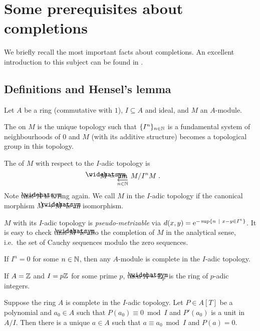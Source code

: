 \documentclass[a4paper,parskip=half,numbers=enddot, DIV=12]{scrreprt}
\begin{document}
\section{Some prerequisites about completions}
We briefly recall the most important facts about completions. An excellent introduction to this subject can be found in \cite[Section~10]{atiyahMacdonald}.
\subsection{Definitions and Hensel's lemma}
\begin{defi}
	Let $A$ be a ring (commutative with $1$), $I\subseteq A$ and ideal, and $M$ an $A$-module.
	\begin{alphanumerate}
		\item The  on $M$ is the unique topology such that $\{I^n\}_{n\in \mathbb{N}}$ is a fundamental system of neighbourhoods of $0$ and $M$ (with its additive structure) becomes a topological group in this topology.
		\item The  of $M$ with respect to the $I$-adic topology is
		\begin{align*}
			\roof{M}=\limit[n\in \IN]M/I^nM\;.
		\end{align*}
		Note that $\roof{A}$ is a ring again. We call $M$  in the $I$-adic topology if the canonical morphism $M\morphism\roof{M}$ is an isomorphism.
	\end{alphanumerate}
\end{defi}
\begin{rem}
	$M$ with its $I$-adic topology is \emph{pseudo-metrizable} via $d(x,y)=\mathrm{e}^{-\sup\left\{n\ \middle|\  x-y\in I^n\right\}}$. It is easy to check that $\roof{M}$ is also the completion of $M$ in the analytical sense, i.e.\ the set of Cauchy sequences modulo the zero sequences.
\end{rem}
\begin{example}
	If $I^n=0$ for some $n\in \mathbb{N}$, then any $A$-module is complete in the $I$-adic topology.
\end{example}
\begin{example}
	If $A=\mathbb{Z}$ and $I=p\mathbb{Z}$ for some prime $p$, then $\roof{A}=\IZ_p$ is the ring of $p$-adic integers.
\end{example}
\begin{prop}
	Suppose the ring $A$ is complete in the $I$-adic topology. Let $P\in A[T]$ be a polynomial and $a_0\in A$ such that $P(a_0)\equiv 0\bmod I$ and $P'(a_0)$ is a unit in $A/I$. Then there is a unique $a\in A$ such that $a\equiv a_0\bmod I$ and $P(a)=0$.
\end{prop}
\end{document}
